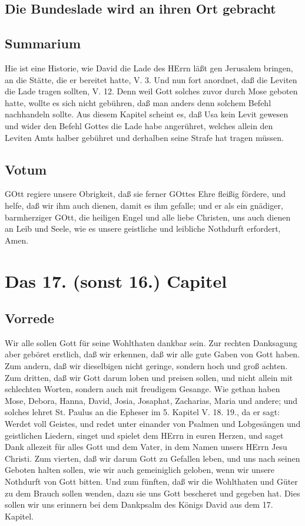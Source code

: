 \section[Die Bundeslade wird an ihren Ort gebracht]{Die Bundeslade wird an ihren Ort gebracht}

\section{Summarium}

Hie ist eine Historie, wie David die Lade des HErrn läßt gen Jerusalem bringen, an die Stätte, die er bereitet hatte, V. 3. Und nun fort anordnet, daß die Leviten die Lade tragen sollten, V. 12. Denn weil Gott solches zuvor durch Mose geboten hatte, wollte es sich nicht gebühren, daß man anders denn solchem Befehl nachhandeln sollte. Aus diesem Kapitel scheint es, daß Usa kein Levit gewesen und wider den Befehl Gottes die Lade habe angerühret, welches allein den Leviten Amts halber gebühret und derhalben seine Strafe hat tragen müssen.

\section{Votum}

GOtt regiere unsere Obrigkeit, daß sie ferner GOttes Ehre fleißig fördere, und helfe, daß wir ihm auch dienen, damit es ihm gefalle; und er als ein gnädiger, barmherziger GOtt, die heiligen Engel und alle liebe Christen, uns auch dienen an Leib und Seele, wie es unsere geistliche und leibliche Nothdurft erfordert, Amen.

\chapter{Das 17. (sonst 16.) Capitel}

\section{Vorrede}

Wir alle sollen Gott für seine Wohlthaten dankbar sein. Zur rechten Danksagung aber geböret erstlich, daß wir erkennen, daß wir alle gute Gaben von Gott haben. Zum andern, daß wir dieselbigen nicht geringe, sondern hoch und groß achten. Zum dritten, daß wir Gott darum loben und preisen sollen, und nicht allein mit schlechten Worten, sondern auch mit freudigem Gesange. Wie gethan haben Mose, Debora, Hanna, David, Josia, Josaphat, Zacharias, Maria und andere; und solches lehret St. Paulus an die Epheser im 5. Kapitel V. 18. 19., da er sagt: Werdet voll Geistes, und redet unter einander von Psalmen und Lobgesängen und geistlichen Liedern, singet und spielet dem HErrn in euren Herzen, und saget Dank allezeit für alles Gott und dem Vater, in dem Namen unsers HErrn Jesu Christi. Zum vierten, daß wir darum Gott zu Gefallen leben, und uns nach seinen Geboten halten sollen, wie wir auch gemeiniglich geloben, wenn wir unsere Nothdurft von Gott bitten. Und zum fünften, daß wir die Wohlthaten und Güter zu dem Brauch sollen wenden,
dazu sie uns Gott bescheret und gegeben hat. Dies sollen wir uns erinnern bei dem Dankpsalm des Königs David aus dem 17. Kapitel.

